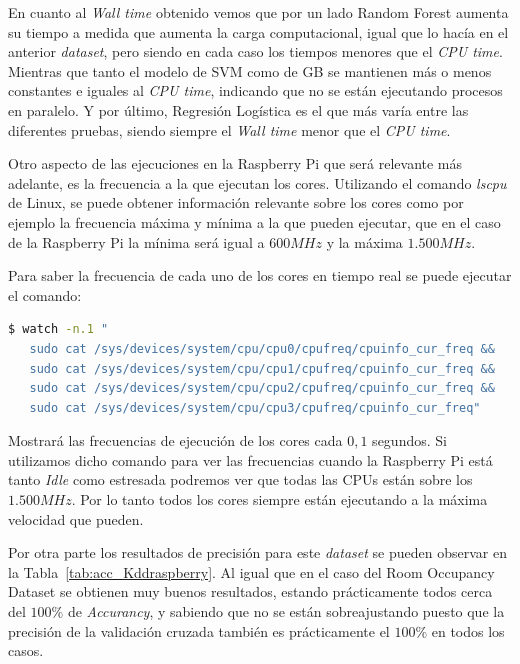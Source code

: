 \documentclass[a4paper, 12pt]{book}
\begin{document}
En cuanto al \textit{Wall time} obtenido vemos que por un lado Random Forest aumenta su tiempo a medida que aumenta la carga computacional, igual que lo hacía en el anterior \textit{dataset}, pero siendo en cada caso los tiempos menores que el \textit{CPU time}. Mientras que tanto el modelo de SVM como de GB se mantienen más o menos constantes e iguales al \textit{CPU time}, indicando que no se están ejecutando procesos en paralelo. Y por último, Regresión Logística es el que más varía entre las diferentes pruebas, siendo siempre el \textit{Wall time} menor que el \textit{CPU time}.

Otro aspecto de las ejecuciones en la Raspberry Pi que será relevante más adelante, es la frecuencia a la que ejecutan los cores. Utilizando el comando \textit{lscpu} de Linux, se puede obtener información relevante sobre los cores como por ejemplo la frecuencia máxima y mínima a la que pueden ejecutar, que en el caso de la Raspberry Pi la mínima será igual a $600MHz$ y la máxima $1.500MHz$. 

Para saber la frecuencia de cada uno de los cores en tiempo real se puede ejecutar el comando:\\

\begin{lstlisting}[language=bash, showstringspaces=false]
   $ watch -n.1 "
   sudo cat /sys/devices/system/cpu/cpu0/cpufreq/cpuinfo_cur_freq && 
   sudo cat /sys/devices/system/cpu/cpu1/cpufreq/cpuinfo_cur_freq && 
   sudo cat /sys/devices/system/cpu/cpu2/cpufreq/cpuinfo_cur_freq && 
   sudo cat /sys/devices/system/cpu/cpu3/cpufreq/cpuinfo_cur_freq"
\end{lstlisting}

Mostrará las frecuencias de ejecución de los cores cada $0,1$ segundos. Si utilizamos dicho comando para ver las frecuencias cuando la Raspberry Pi está tanto \textit{Idle} como estresada podremos ver que todas las CPUs están sobre los $1.500MHz$. Por lo tanto todos los cores siempre están ejecutando a la máxima velocidad que pueden.

Por otra parte los resultados de precisión para este \textit{dataset} se pueden observar en la Tabla~\ref{tab:acc_Kddraspberry}. Al igual que en el caso del Room Occupancy Dataset se obtienen muy buenos resultados, estando prácticamente todos cerca del $100\%$ de \textit{Accurancy}, y sabiendo que no se están sobreajustando puesto que la precisión de la validación cruzada también es prácticamente el $100\%$ en todos los casos.
\end{document}
